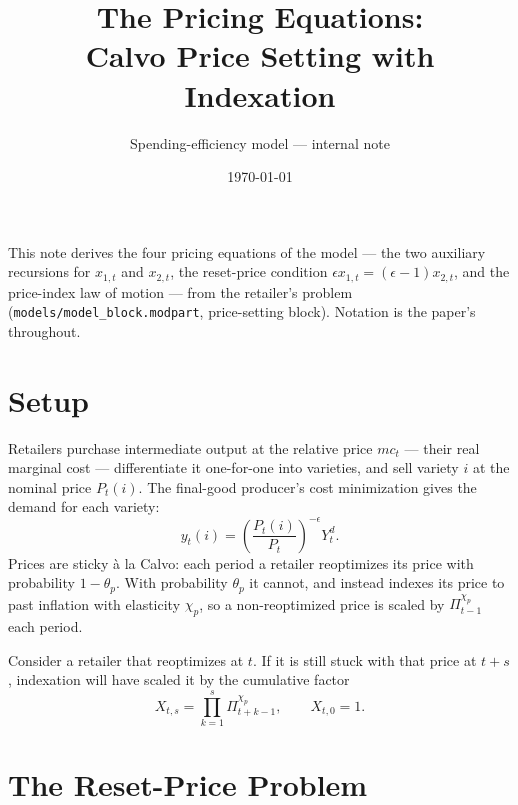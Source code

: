 \documentclass[11pt]{article}
\title{The Pricing Equations:\\ Calvo Price Setting with Indexation}
\author{Spending-efficiency model --- internal note}
\date{\today}
\begin{document}
\maketitle

\noindent
This note derives the four pricing equations of the model --- the two auxiliary
recursions for $x_{1,t}$ and $x_{2,t}$, the reset-price condition
$\epsilon x_{1,t} = (\epsilon-1)x_{2,t}$, and the price-index law of motion ---
from the retailer's problem (\texttt{models/model\_block.modpart}, price-setting
block). Notation is the paper's throughout.

\section{Setup}

Retailers purchase intermediate output at the relative price $mc_t$ --- their real
marginal cost --- differentiate it one-for-one into varieties, and sell variety $i$
at the nominal price $P_t(i)$. The final-good producer's cost minimization gives
the demand for each variety:
\begin{equation}\label{eq:demand}
    y_t(i) = \left(\frac{P_t(i)}{P_t}\right)^{-\epsilon} Y_t^{d}.
\end{equation}
Prices are sticky \`a la Calvo: each period a retailer reoptimizes its price with
probability $1-\theta_p$. With probability $\theta_p$ it cannot, and instead
indexes its price to past inflation with elasticity $\chi_p$, so a non-reoptimized
price is scaled by $\Pi_{t-1}^{\chi_p}$ each period.

Consider a retailer that reoptimizes at $t$. If it is still stuck with that price
at $t+s$, indexation will have scaled it by the cumulative factor
\begin{equation}\label{eq:index}
    X_{t,s} = \prod_{k=1}^{s} \Pi_{t+k-1}^{\chi_p}, \qquad X_{t,0} = 1.
\end{equation}

\section{The Reset-Price Problem}
\end{document}
